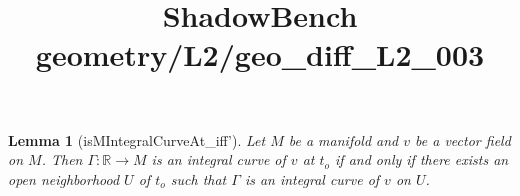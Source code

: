 \documentclass{article}
\title{ShadowBench geometry/L2/geo\_diff\_L2\_003}
\newtheorem{lemma}{Lemma}
\begin{document}
\maketitle

\begin{lemma}[isMIntegralCurveAt_iff']
Let $M$ be a manifold and $v$ be a vector field on $M$. Then $\Gamma : ℝ → M$ is an integral curve of $v$ at $t_o$ 
if and only if there exists an open neighborhood $U$ of $t_o$ such that $\Gamma$ is an integral curve of $v$ on $U$.
\end{lemma}
\end{document}
